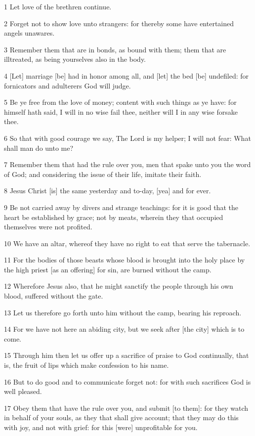 \par 1 Let love of the brethren continue.
\par 2 Forget not to show love unto strangers: for thereby some have entertained angels unawares.
\par 3 Remember them that are in bonds, as bound with them; them that are illtreated, as being yourselves also in the body.
\par 4 [Let] marriage [be] had in honor among all, and [let] the bed [be] undefiled: for fornicators and adulterers God will judge.
\par 5 Be ye free from the love of money; content with such things as ye have: for himself hath said, I will in no wise fail thee, neither will I in any wise forsake thee.
\par 6 So that with good courage we say, The Lord is my helper; I will not fear: What shall man do unto me?
\par 7 Remember them that had the rule over you, men that spake unto you the word of God; and considering the issue of their life, imitate their faith.
\par 8 Jesus Christ [is] the same yesterday and to-day, [yea] and for ever.
\par 9 Be not carried away by divers and strange teachings: for it is good that the heart be established by grace; not by meats, wherein they that occupied themselves were not profited.
\par 10 We have an altar, whereof they have no right to eat that serve the tabernacle.
\par 11 For the bodies of those beasts whose blood is brought into the holy place by the high priest [as an offering] for sin, are burned without the camp.
\par 12 Wherefore Jesus also, that he might sanctify the people through his own blood, suffered without the gate.
\par 13 Let us therefore go forth unto him without the camp, bearing his reproach.
\par 14 For we have not here an abiding city, but we seek after [the city] which is to come.
\par 15 Through him then let us offer up a sacrifice of praise to God continually, that is, the fruit of lips which make confession to his name.
\par 16 But to do good and to communicate forget not: for with such sacrifices God is well pleased.
\par 17 Obey them that have the rule over you, and submit [to them]: for they watch in behalf of your souls, as they that shall give account; that they may do this with joy, and not with grief: for this [were] unprofitable for you.
